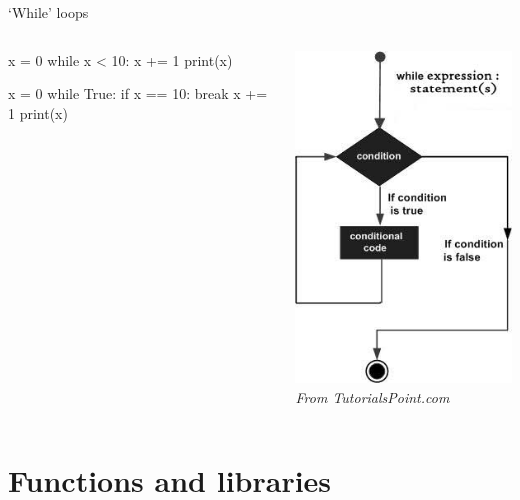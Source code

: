 \begin{frame}[fragile]{`While' loops}
    \begin{columns}
        \begin{column}{0.5\textwidth}
            \begin{py3}
                x = 0
                while x < 10:
                    x += 1
                    print(x)
            \end{py3}
            \vfill
            \begin{py3}
                x = 0
                while True:
                    if x == 10:
                        break
                    x += 1
                    print(x)
            \end{py3}
        \end{column}
        \begin{column}{0.5\textwidth}
            \begin{center}
                \includegraphics[height=0.75\textheight]{figures/while_loop} \\
                {\scriptsize\em%
                 From \textit{TutorialsPoint.com}}
            \end{center}
        \end{column}
    \end{columns}
\end{frame}

\section{Functions and libraries}

